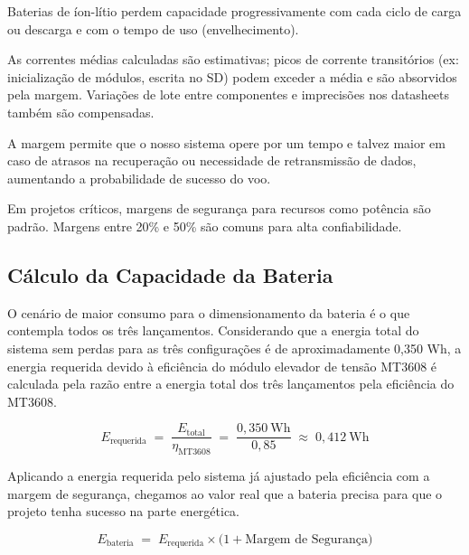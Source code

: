 Baterias de íon-lítio perdem capacidade progressivamente com cada ciclo de carga ou descarga e com o tempo de uso (envelhecimento). 

As correntes médias calculadas são estimativas; picos de corrente transitórios (ex: inicialização de módulos, escrita no SD) podem exceder a média e são absorvidos pela margem. Variações de lote entre componentes e imprecisões nos datasheets também são compensadas. 

A margem permite que o nosso sistema opere por um tempo e talvez maior em caso de atrasos na recuperação ou necessidade de retransmissão de dados, aumentando a probabilidade de sucesso do voo. 

Em projetos críticos, margens de segurança para recursos como potência são padrão. \cite{nasa2016} Margens entre 20\% e 50\% são comuns para alta confiabilidade. 


\subsection{Cálculo da Capacidade da Bateria}

O cenário de maior consumo para o dimensionamento da bateria é o que contempla todos os três lançamentos. Considerando que a energia total do sistema sem perdas para as três configurações é de aproximadamente 0,350 Wh, a energia requerida devido à eficiência do módulo elevador de tensão MT3608 é calculada pela razão entre a energia total dos três lançamentos pela eficiência do MT3608.

\begin{equation}
E_{\text{requerida}}
\;=\;
\frac{E_{\text{total}}}{\eta_{\text{MT3608}}}
\;=\;
\frac{0,350~\mathrm{Wh}}{0,85}
\;\approx\;
0,412~\mathrm{Wh}
\end{equation}

Aplicando a energia requerida pelo sistema já ajustado pela eficiência com a margem de segurança, chegamos ao valor real que a bateria precisa para que o projeto tenha sucesso na parte energética.

\begin{equation}
E_{\text{bateria}}
\;=\;
E_{\text{requerida}}
\times
\bigl(1 + \text{Margem de Segurança}\bigr)
\end{equation}

